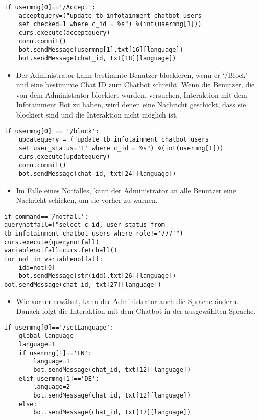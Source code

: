 \begin{lstlisting}[frame=single]
if usermng[0]=='/Accept':
	acceptquery=("update tb_infotainment_chatbot_users 
	set checked=1 where c_id = %s") %(int(usermng[1]))
	curs.execute(acceptquery)
	conn.commit()
	bot.sendMessage(usermng[1],txt[16][language])
	bot.sendMessage(chat_id, txt[18][language])
\end{lstlisting}
\begin{itemize}
	\item Der Administrator kann bestimmte Benutzer blockieren, wenn er ‘/Block’ und eine bestimmte Chat ID zum Chatbot schreibt. Wenn die Benutzer, die von dem Administrator blockiert wurden, versuchen, Interaktion mit dem Infotainment Bot zu haben, wird denen eine Nachricht geschickt, dass sie blockiert sind und die Interaktion nicht m\"oglich ist.
\end{itemize}
\begin{lstlisting}[frame=single]
if usermng[0] == '/block':
	updatequery = ("update tb_infotainment_chatbot_users 
	set user_status='1' where c_id = %s") %(int(usermng[1]))
	curs.execute(updatequery)
	conn.commit()
	bot.sendMessage(chat_id, txt[24][language])
\end{lstlisting}
\begin{itemize}
	\item Im Falle eines Notfalles, kann der Administrator an alle Benutzer eine Nachricht schicken, um sie vorher zu warnen.   
\end{itemize}
\begin{lstlisting}[frame=single]
if command=='/notfall':
querynotfall=("select c_id, user_status from tb_infotainment_chatbot_users where role!='777'")
curs.execute(querynotfall)
variablenotfall=curs.fetchall()
for not in variablenotfall:
	idd=not[0]
	bot.sendMessage(str(idd),txt[26][language])
bot.sendMessage(chat_id, txt[27][language])
\end{lstlisting}
\begin{itemize}
	\item Wie vorher erw\"ahnt, kann der Administrator auch die Sprache \"andern. Danach folgt die Interaktion mit dem Chatbot in der ausgew\"ahlten Sprache.   
\end{itemize}
\begin{lstlisting}[frame=single]
if usermng[0]=='/setLanguage':
	global language
	language=1
	if usermng[1]=='EN':
		language=1
		bot.sendMessage(chat_id, txt[12][language])
	elif usermng[1]=='DE':
		language=2
		bot.sendMessage(chat_id, txt[12][language])
	else:
		bot.sendMessage(chat_id, txt[17][language])
\end{lstlisting}
